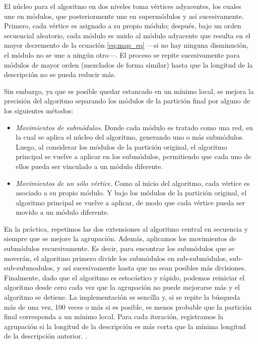 \documentclass[letterpaper, 11pt]{book}
\theoremstyle{definition}
\theoremstyle{remark}
\begin{document}
El núcleo para el algoritmo en dos niveles toma vértices adyacentes, los cuales une en módulos, que posteriormente une en supermódulos y así sucesivamente. 
Primero, cada vértice es asignado a su propio módulo; después, bajo un orden secuencial aleatorio, cada módulo es unido al módulo adyacente que resulta en el mayor decremento de la ecuación \ref{eq:map_eq} ---si no hay ninguna disminución, el módulo no se une a ningún otro---. 
El proceso se repite sucesivamente para módulos de mayor orden (mezclados de forma similar) hasta que la longitud de la descripción no se pueda reducir más. 


Sin embargo, ya que es posible quedar estancado en un mínimo local, se mejora la precisión del algoritmo separando los módulos de la partición final por alguno de los siguientes métodos: 

\begin{itemize}
    \item \emph{Movimientos de submódulos}. Donde cada módulo es tratado como una red, en la cual se aplica el núcleo del algoritmo, generando uno o más submódulos. 
    Luego, al considerar los módulos de la partición original, el algoritmo principal se vuelve a aplicar en los submódulos, permitiendo que cada uno de ellos pueda ser vinculado a un módulo diferente. 
    \item \emph{Movimientos de un sólo vértice}. Como al inicio del algoritmo, cada vértice es asociado a su propio módulo. 
    Y bajo los módulos de la partición original, el algoritmo principal se vuelve a aplicar, de modo que cada vértice pueda ser movido a un módulo diferente. 
\end{itemize}


\begin{center}
    \begin{minipage}{0.9\linewidth}
        {\setlength{\parindent}{12pt}\small
        En la práctica, repetimos las dos extensiones al algoritmo central en secuencia y siempre que se mejore la agrupación. 
        Además, aplicamos los movimientos de submódulos recursivamente. 
        Es decir, para encontrar los submódulos que se moverán, el algoritmo primero divide los submódulos en sub-submódulos, sub-sub-submodulos, y así sucesivamente hasta que no sean posibles más divisiones. 
        Finalmente, dado que el algoritmo es estocástico y rápido, podemos reiniciar el algoritmo desde cero cada vez que la agrupación no puede mejorarse más y el algoritmo se detiene. 
        La implementación es sencilla y, si se repite la búsqueda más de una vez, 100 veces o más si es posible, es menos probable que la partición final corresponda a un mínimo local. 
        Para cada iteración, registramos la agrupación si la longitud de la descripción es más corta que la mínima longitud de la descripción anterior. \normalsize \citep[12]{2014_Rosvall_CommunityMapEq}.
        }
    \end{minipage}
\end{center}
\end{document}
